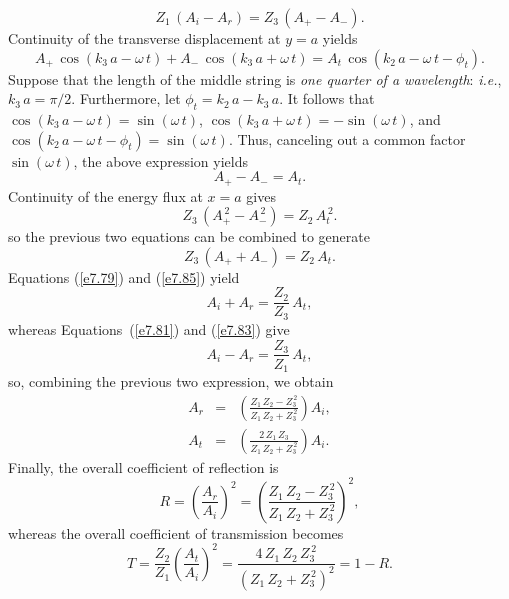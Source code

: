 \begin{equation}\label{e7.81}
Z_1\,(A_i-A_r)= Z_3\,(A_+-A_-).
\end{equation}
Continuity of the transverse displacement at $y=a$
yields
\begin{equation}
A_+\,\cos(k_3\,a-\omega\,t)+ A_-\,\cos(k_3\,a+\omega\,t)=
A_t\,\cos(k_2\,a-\omega\,t-\phi_t).
\end{equation}
Suppose that the length of the middle string is {\em one quarter of a wavelength}: {\em i.e.}, $k_3\,a=\pi/2$. Furthermore, let $\phi_t=k_2\,a-k_3\,a$. It follows that
$\cos(k_3\,a-\omega\,t)= \sin(\omega\,t)$, $\cos(k_3\,a+\omega\,t)=-\sin(\omega\,t)$, and
$\cos(k_2\,a-\omega\,t-\phi_t)=\sin(\omega\,t)$. Thus, canceling out a
common factor $\sin(\omega\,t)$, the above expression yields
\begin{equation}\label{e7.83}
A_+-A_- = A_t.
\end{equation}
Continuity of the energy flux at $x=a$ gives
\begin{equation}
Z_3\,(A_+^{\,2}-A_-^{\,2}) = Z_2\,A_t^{\,2}.
\end{equation}
so the previous two equations can be combined to generate
\begin{equation}\label{e7.85}
Z_3\,(A_+ + A_-)= Z_2\,A_t.
\end{equation}
Equations (\ref{e7.79}) and (\ref{e7.85}) yield
\begin{equation}
A_i + A_r = \frac{Z_2}{Z_3}\,A_t,
\end{equation}
whereas Equations~(\ref{e7.81}) and (\ref{e7.83}) give
\begin{equation}
A_i-A_r=\frac{Z_3}{Z_1}\,A_t,
\end{equation}
so, combining the previous two expression, we obtain
\begin{eqnarray}
A_r &=& \left(\frac{Z_1\,Z_2-Z_3^{\,2}}{Z_1\,Z_2+Z_3^{\,2}}\right)A_i,\\[0.5ex]
A_t &=&\left(\frac{2\,Z_1\,Z_3}{Z_1\,Z_2+Z_3^{\,2}}\right) A_i.
\end{eqnarray}
Finally, the overall coefficient of reflection is
\begin{equation}
R = \left(\frac{A_r}{A_i}\right)^2 = \left(\frac{Z_1\,Z_2-Z_3^{\,2}}{Z_1\,Z_2+Z_3^{\,2}}\right)^2,
\end{equation}
whereas the overall coefficient of transmission becomes
\begin{equation}
T = \frac{Z_2}{Z_1}\left(\frac{A_t}{A_i}\right)^2= \frac{4\,Z_1\,Z_2\,Z_3^{\,2}}{(Z_1\,Z_2+Z_3^{\,2})^2}=1-R.
\end{equation}
